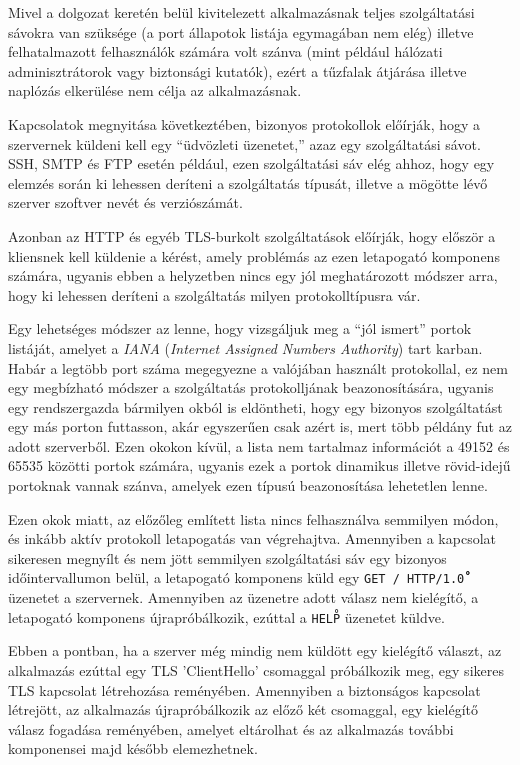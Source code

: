 \documentclass[a4paper,12pt]{article}
\newcounter{subsubsubsection}[subsubsection]
\begin{document}
	Mivel a dolgozat keretén belül kivitelezett alkalmazásnak teljes szolgáltatási sávokra van szüksége (a port állapotok listája egymagában nem elég) illetve felhatalmazott felhasználók számára volt szánva (mint például hálózati adminisztrátorok vagy biztonsági kutatók), ezért a tűzfalak átjárása illetve naplózás elkerülése nem célja az alkalmazásnak.


	Kapcsolatok megnyitása következtében, bizonyos protokollok előírják, hogy a szervernek küldeni kell egy ``üdvözleti üzenetet,'' azaz egy szolgáltatási sávot. SSH, SMTP és FTP esetén például, ezen szolgáltatási sáv elég ahhoz, hogy egy elemzés során ki lehessen deríteni a szolgáltatás típusát, illetve a mögötte lévő szerver szoftver nevét és verziószámát.
	
	Azonban az HTTP és egyéb TLS-burkolt szolgáltatások előírják, hogy először a kliensnek kell küldenie a kérést, amely problémás az ezen letapogató komponens számára, ugyanis ebben a helyzetben nincs egy jól meghatározott módszer arra, hogy ki lehessen deríteni a szolgáltatás milyen protokolltípusra vár.
	
	Egy lehetséges módszer az lenne, hogy vizsgáljuk meg a ``jól ismert'' portok\cite{iana16} listáját, amelyet a \textit{IANA} (\textit{Internet Assigned Numbers Authority}) tart karban. Habár a legtöbb port száma megegyezne a valójában használt protokollal, ez nem egy megbízható módszer a szolgáltatás protokolljának beazonosítására, ugyanis egy rendszergazda bármilyen okból is eldöntheti, hogy egy bizonyos szolgáltatást egy más porton futtasson, akár egyszerűen csak azért is, mert több példány fut az adott szerverből. Ezen okokon kívül, a lista nem tartalmaz információt a 49152 és 65535 közötti portok számára, ugyanis ezek a portok dinamikus illetve rövid-idejű portoknak vannak szánva, amelyek ezen típusú beazonosítása lehetetlen lenne.
	
	Ezen okok miatt, az előzőleg említett lista nincs felhasználva semmilyen módon, és inkább aktív protokoll letapogatás van végrehajtva. Amennyiben a kapcsolat sikeresen megnyílt és nem jött semmilyen szolgáltatási sáv egy bizonyos időintervallumon belül, a letapogató komponens küld egy \texttt{GET / HTTP/1.0}\texttt{\r\n\r\n} üzenetet a szervernek. Amennyiben az üzenetre adott válasz nem kielégítő, a letapogató komponens újrapróbálkozik, ezúttal a \texttt{HELP\r\n} üzenetet küldve.
	
	Ebben a pontban, ha a szerver még mindig nem küldött egy kielégítő választ, az alkalmazás ezúttal egy TLS 'ClientHello' csomaggal próbálkozik meg, egy sikeres TLS kapcsolat létrehozása reményében. Amennyiben a biztonságos kapcsolat létrejött, az alkalmazás újrapróbálkozik az előző két csomaggal, egy kielégítő válasz fogadása reményében, amelyet eltárolhat és az alkalmazás további komponensei majd később elemezhetnek.
\end{document}
